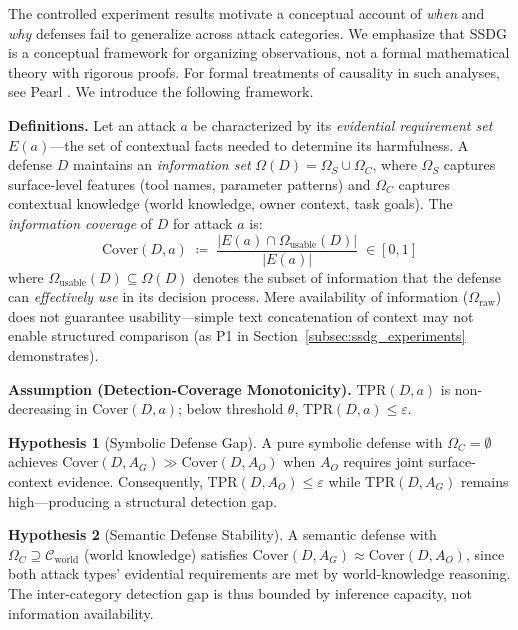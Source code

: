 \documentclass{article}
\theoremstyle{definition}
\newtheorem{hypothesis}{Hypothesis}
\begin{document}
The controlled experiment results motivate a conceptual account of
\emph{when} and \emph{why} defenses fail to generalize across attack
categories. We emphasize that SSDG is a conceptual framework for organizing observations, not a formal mathematical theory with rigorous proofs. For formal treatments of causality in such analyses, see Pearl \cite{pearl2009causality}. We introduce the following framework.

\textbf{Definitions.} Let an attack $a$ be characterized by its
\emph{evidential requirement set} $E(a)$---the set of contextual facts
needed to determine its harmfulness. A defense $D$ maintains an
\emph{information set} $\Omega(D) = \Omega_S \cup \Omega_C$, where
$\Omega_S$ captures surface-level features (tool names, parameter
patterns) and $\Omega_C$ captures contextual knowledge (world knowledge,
owner context, task goals). The \emph{information coverage} of $D$ for
attack $a$ is:
\[
  \mathrm{Cover}(D,a) \;\coloneqq\; \frac{|E(a) \cap \Omega_{\mathrm{usable}}(D)|}{|E(a)|}
  \;\in [0,1]
\]
where $\Omega_{\mathrm{usable}}(D) \subseteq \Omega(D)$ denotes the subset of
information that the defense can \emph{effectively use} in its decision
process. Mere availability of information ($\Omega_{\mathrm{raw}}$) does not
guarantee usability---simple text concatenation of context may not enable
structured comparison (as P1 in Section~\ref{subsec:ssdg_experiments}
demonstrates).

\textbf{Assumption (Detection-Coverage Monotonicity).}
$\mathrm{TPR}(D,a)$ is non-decreasing in $\mathrm{Cover}(D,a)$; below
threshold $\theta$, $\mathrm{TPR}(D,a) \leq \varepsilon$.

\begin{hypothesis}[Symbolic Defense Gap]
\label{hyp:symbolic_gap}
A pure symbolic defense with $\Omega_C = \emptyset$ achieves
$\mathrm{Cover}(D, A_G) \gg \mathrm{Cover}(D, A_O)$ when $A_O$ requires
joint surface-context evidence. Consequently, $\mathrm{TPR}(D, A_O)
\leq \varepsilon$ while $\mathrm{TPR}(D, A_G)$ remains high---producing
a structural detection gap.
\end{hypothesis}

\begin{hypothesis}[Semantic Defense Stability]
\label{hyp:semantic_stability}
A semantic defense with $\Omega_C \supseteq \mathcal{C}_{\mathrm{world}}$
(world knowledge) satisfies $\mathrm{Cover}(D, A_G) \approx
\mathrm{Cover}(D, A_O)$, since both attack types' evidential requirements
are met by world-knowledge reasoning. The inter-category detection gap
is thus bounded by inference capacity, not information availability.
\end{hypothesis}
\end{document}
